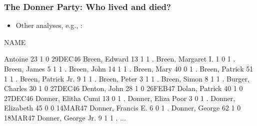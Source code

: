 \begin{frame}[fragile]
\frametitle{The Donner Party: Who lived and died?}
\begin{itemize}
\item Other analyses, e.g., \citep{RamsaySchafer:97}: 
\end{itemize}
\begin{Output}[baselinestretch=0.55]
NAME                 

Antoine               23     1        0      29DEC46
Breen, Edward         13     1        1            .
Breen, Margaret I.     1     0        1            .
Breen, James           5     1        1            .
Breen, John           14     1        1            .
Breen, Mary           40     0        1            .
Breen, Patrick        51     1        1            .
Breen, Patrick Jr.     9     1        1            .
Breen, Peter           3     1        1            .
Breen, Simon           8     1        1            .
Burger, Charles       30     1        0      27DEC46
Denton, John          28     1        0      26FEB47
Dolan, Patrick        40     1        0      27DEC46
Donner, Elitha Cumi   13     0        1            .
Donner, Eliza Poor     3     0        1            .
Donner, Elizabeth     45     0        0      14MAR47
Donner, Francis E.     6     0        1            .
Donner, George        62     1        0      18MAR47
Donner, George Jr.     9     1        1            .
 ...
\end{Output}

\end{frame}

